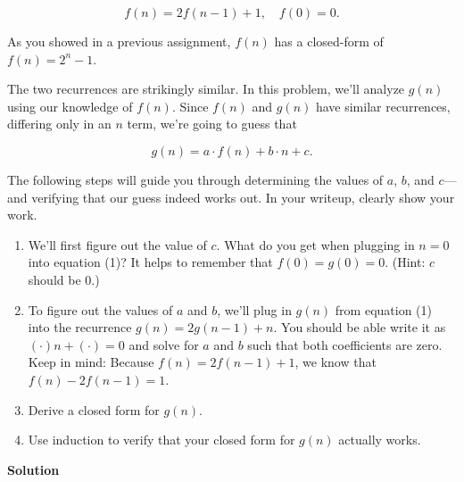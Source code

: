 \documentclass{article}
\newcommand{\solution}{\textbf{\large Solution}}
\theoremstyle{remark}
\begin{document}
\[ f(n) = 2 f(n - 1) + 1, \quad f(0) = 0. \]

As you showed in a previous assignment, $f(n)$ has a closed-form of $f(n) = 2^n - 1$.

The two recurrences are strikingly similar. In this problem, we’ll analyze $g(n)$ using our knowledge of $f(n)$. Since $f(n)$ and $g(n)$ have similar recurrences, differing only in an $n$ term, we’re going to guess that

\[ g(n) = a \cdot f(n) + b \cdot n + c. \tag{1} \]

The following steps will guide you through determining the values of $a$, $b$, and $c$—and verifying that our guess indeed works out. In your writeup, clearly show your work.

\begin{enumerate}
    \item[(i)] We’ll first figure out the value of $c$. What do you get when plugging in $n = 0$ into equation (1)? It helps to remember that $f(0) = g(0) = 0$. (Hint: $c$ should be 0.)
    \item[(ii)] To figure out the values of $a$ and $b$, we’ll plug in $g(n)$ from equation (1) into the recurrence $g(n) = 2g(n - 1) + n$. You should be able write it as $(\cdot) n + (\cdot) = 0$ and solve for $a$ and $b$ such that both coefficients are zero. Keep in mind: Because $f(n) = 2 f(n - 1) + 1$, we know that $f(n) - 2 f(n - 1) = 1$.
    \item[(iii)] Derive a closed form for $g(n)$.
    \item[(iv)] Use induction to verify that your closed form for $g(n)$ actually works.
\end{enumerate}

\medskip
\solution
\end{document}
